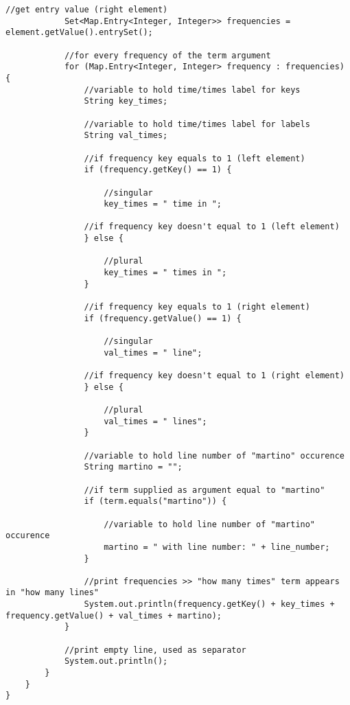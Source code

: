 \documentclass{article} %
\begin{document}
\begin{lstlisting}[style=Java]
			//get entry value (right element)
			Set<Map.Entry<Integer, Integer>> frequencies = element.getValue().entrySet();
			
			//for every frequency of the term argument
			for (Map.Entry<Integer, Integer> frequency : frequencies) {
				//variable to hold time/times label for keys
				String key_times;
				
				//variable to hold time/times label for labels
				String val_times;
				
				//if frequency key equals to 1 (left element)
				if (frequency.getKey() == 1) {
				
					//singular
					key_times = " time in ";
				
				//if frequency key doesn't equal to 1 (left element)
				} else {
					
					//plural
					key_times = " times in ";
				}
				
				//if frequency key equals to 1 (right element)
				if (frequency.getValue() == 1) {
				
					//singular
					val_times = " line";
				
				//if frequency key doesn't equal to 1 (right element)
				} else {
					
					//plural
					val_times = " lines";
				}
				
				//variable to hold line number of "martino" occurence
				String martino = "";
				
				//if term supplied as argument equal to "martino"
				if (term.equals("martino")) {
					
					//variable to hold line number of "martino" occurence
					martino = " with line number: " + line_number;
				}
				
				//print frequencies >> "how many times" term appears in "how many lines"
				System.out.println(frequency.getKey() + key_times + frequency.getValue() + val_times + martino);
			}
			
			//print empty line, used as separator
			System.out.println();
		}
	}
}
\end{lstlisting}
\printbibliography
\end{document}
